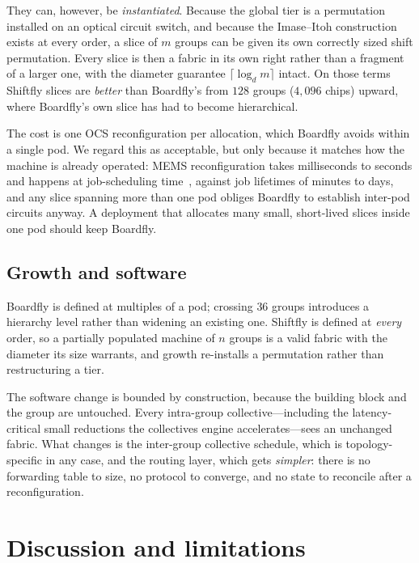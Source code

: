 \documentclass[sigconf,nonacm]{acmart}
\theoremstyle{acmdefinition}%
\begin{document}
They can, however, be \emph{instantiated}. Because the global tier is a
permutation installed on an optical circuit switch, and because the Imase--Itoh
construction exists at every order, a slice of $m$ groups can be given its own
correctly sized shift permutation. Every slice is then a fabric in its own right
rather than a fragment of a larger one, with the diameter guarantee
$\lceil\log_d m\rceil$ intact. On those terms Shiftfly slices are \emph{better}
than Boardfly's from $128$ groups ($4{,}096$ chips) upward, where Boardfly's own
slice has had to become hierarchical.

The cost is one OCS reconfiguration per allocation, which Boardfly avoids within
a single pod. We regard this as acceptable, but only because it matches how the
machine is already operated: MEMS reconfiguration takes milliseconds to seconds
and happens at job-scheduling
time~\cite{poutievski2022jupiter,jouppi2023tpuv4}, against job lifetimes of
minutes to days, and any slice spanning more than one pod obliges Boardfly to
establish inter-pod circuits anyway. A deployment that allocates many small,
short-lived slices inside one pod should keep Boardfly.

\subsection{Growth and software}

Boardfly is defined at multiples of a pod; crossing $36$ groups introduces a
hierarchy level rather than widening an existing one. Shiftfly is defined at
\emph{every} order, so a partially populated machine of $n$ groups is a valid
fabric with the diameter its size warrants, and growth re-installs a
permutation rather than restructuring a tier.

The software change is bounded by construction, because the building block and
the group are untouched. Every intra-group collective---including the
latency-critical small reductions the collectives engine
accelerates---sees an unchanged fabric. What changes is the inter-group
collective schedule, which is topology-specific in any case, and the routing
layer, which gets \emph{simpler}: there is no forwarding table to size, no
protocol to converge, and no state to reconcile after a reconfiguration.

\section{Discussion and limitations}
\label{sec:limits}
\end{document}
